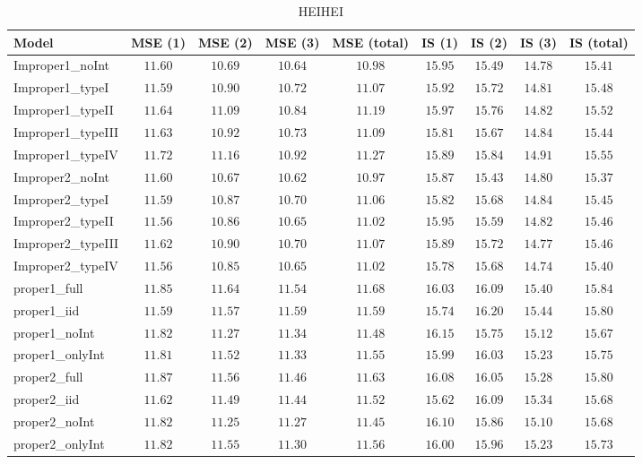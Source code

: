 \begin{table}

\caption{\label{tab:model-choice-sc1}HEIHEI}
\centering
\begin{tabular}{lcccccccc}
\hline
Model  & MSE (1) & MSE (2) & MSE (3) & MSE (total) & IS (1) & IS (2) & IS (3) & \multicolumn{1}{c}{IS (total)} \\ 
\hline
Improper1_noInt  & $11.60$ & $10.69$ & $10.64$ & $10.98$ & $15.95$ & $15.49$ & $14.78$ & $15.41$ \\
Improper1_typeI  & $11.59$ & $10.90$ & $10.72$ & $11.07$ & $15.92$ & $15.72$ & $14.81$ & $15.48$ \\
Improper1_typeII  & $11.64$ & $11.09$ & $10.84$ & $11.19$ & $15.97$ & $15.76$ & $14.82$ & $15.52$ \\
Improper1_typeIII  & $11.63$ & $10.92$ & $10.73$ & $11.09$ & $15.81$ & $15.67$ & $14.84$ & $15.44$ \\
Improper1_typeIV  & $11.72$ & $11.16$ & $10.92$ & $11.27$ & $15.89$ & $15.84$ & $14.91$ & $15.55$ \\
Improper2_noInt  & $11.60$ & $10.67$ & $10.62$ & $10.97$ & $15.87$ & $15.43$ & $14.80$ & $15.37$ \\
Improper2_typeI  & $11.59$ & $10.87$ & $10.70$ & $11.06$ & $15.82$ & $15.68$ & $14.84$ & $15.45$ \\
Improper2_typeII  & $11.56$ & $10.86$ & $10.65$ & $11.02$ & $15.95$ & $15.59$ & $14.82$ & $15.46$ \\
Improper2_typeIII  & $11.62$ & $10.90$ & $10.70$ & $11.07$ & $15.89$ & $15.72$ & $14.77$ & $15.46$ \\
Improper2_typeIV  & $11.56$ & $10.85$ & $10.65$ & $11.02$ & $15.78$ & $15.68$ & $14.74$ & $15.40$ \\
proper1_full  & $11.85$ & $11.64$ & $11.54$ & $11.68$ & $16.03$ & $16.09$ & $15.40$ & $15.84$ \\
proper1_iid  & $11.59$ & $11.57$ & $11.59$ & $11.59$ & $15.74$ & $16.20$ & $15.44$ & $15.80$ \\
proper1_noInt  & $11.82$ & $11.27$ & $11.34$ & $11.48$ & $16.15$ & $15.75$ & $15.12$ & $15.67$ \\
proper1_onlyInt  & $11.81$ & $11.52$ & $11.33$ & $11.55$ & $15.99$ & $16.03$ & $15.23$ & $15.75$ \\
proper2_full  & $11.87$ & $11.56$ & $11.46$ & $11.63$ & $16.08$ & $16.05$ & $15.28$ & $15.80$ \\
proper2_iid  & $11.62$ & $11.49$ & $11.44$ & $11.52$ & $15.62$ & $16.09$ & $15.34$ & $15.68$ \\
proper2_noInt  & $11.82$ & $11.25$ & $11.27$ & $11.45$ & $16.10$ & $15.86$ & $15.10$ & $15.68$ \\
proper2_onlyInt  & $11.82$ & $11.55$ & $11.30$ & $11.56$ & $16.00$ & $15.96$ & $15.23$ & $15.73$ \\
\hline 
\end{tabular}

\end{table}